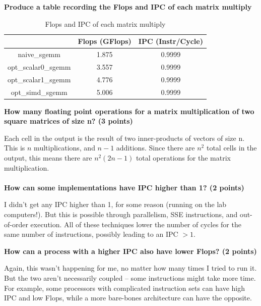 \documentclass{article}
\begin{document}
\textbf{Produce a table recording the Flops and IPC of each matrix multiply}
\begin{table}[!htbp]
\centering
\begin{tabular}{c|c|c|}
 & Flops (GFlops) & IPC (Instr/Cycle)\\
 \hline
 naive\_sgemm & 1.875 & 0.9999\\
 \hline
 opt\_scalar0\_sgemm & 3.557 & 0.9999\\
 \hline
 opt\_scalar1\_sgemm & 4.776 & 0.9999\\
 \hline
 opt\_simd\_sgemm & 5.006 & 0.9999 \\
 \hline
\end{tabular}
\caption{Flops and IPC of each matrix multiply}
\label{tab:my_label}
\end{table}

\textbf{How many floating point operations for a matrix multiplication of two square matrices of size n? (3 points)}

Each cell in the output is the result of two inner-products of vectors of size n. This is $n$ multiplications, and $n-1$ additions. Since there are $n^2$ total cells in the output, this means there are $n^2(2n-1)$ total operations for the matrix multiplication.\\\\

\textbf{How can some implementations have IPC higher than 1? (2 points)}

I didn't get any IPC higher than 1, for some reason (running on the lab computers!). But this is possible through parallelism, SSE instructions, and out-of-order execution. All of these techniques lower the number of cycles for the same number of instructions, possibly leading to an IPC $> 1$.

\textbf{How can a process with a higher IPC also have lower Flops? (2 points)}

Again, this wasn't happening for me, no matter how many times I tried to run it. But the two aren't necessarily coupled -- some instructions might take more time. For example, some processors with complicated instruction sets can have high IPC and low Flops, while a more bare-bones architecture can have the opposite.
\end{document}
